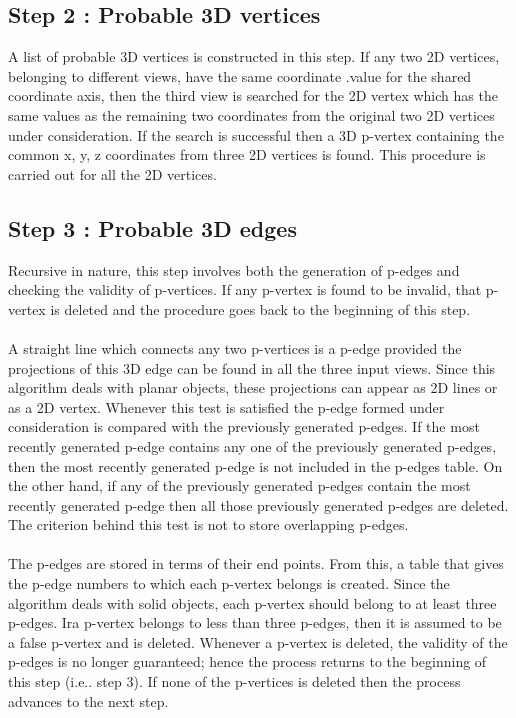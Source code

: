 \documentclass[
11pt, %
english, %
singlespacing, %
headsepline, %
]{MastersDoctoralThesis} %
\begin{document}
\subsection{Step 2 : Probable 3D vertices}
A list of probable 3D vertices is constructed in this step. If any two 2D vertices, belonging to different views, have the same coordinate .value for the shared coordinate axis, then the third view is searched for the 2D vertex which has the same values as the remaining two coordinates from the original two 2D vertices under consideration. If the search is successful then a 3D p-vertex containing the common x, y, z coordinates from three 2D vertices is found. This procedure is carried out for all the 2D vertices.

\subsection{Step 3 : Probable 3D edges }
Recursive in nature, this step involves both the generation of p-edges and checking the validity of p-vertices. If any p-vertex is found to be invalid, that p-vertex is deleted and the procedure goes back to the beginning of this step. \\ \\
A straight line which connects any two p-vertices is a p-edge provided the
projections of this 3D edge can be found in all the three input views. Since this algorithm deals with planar objects, these projections can appear as 2D lines or as a 2D vertex. Whenever this test is satisfied the p-edge formed under consideration is compared with the previously generated p-edges. If the most recently generated p-edge contains any one of the previously generated p-edges, then the most recently generated p-edge is not included in the p-edges table. On the other hand, if any of the previously generated p-edges contain the most recently generated p-edge then all those previously
generated p-edges are deleted. The criterion behind this test is not to store overlapping p-edges. \\ \\
The p-edges are stored in terms of their end points. From this, a table that
gives the p-edge numbers to which each p-vertex belongs is created. Since the algorithm deals with solid objects, each p-vertex should belong to at least three p-edges. Ira p-vertex belongs to less than three p-edges, then it is assumed to be a false p-vertex and is deleted. Whenever a p-vertex is deleted, the validity of the p-edges is no longer guaranteed; hence the process returns to the beginning of this step (i.e.. step 3). If none of
the p-vertices is deleted then the process advances to the next step. 
\end{document}
